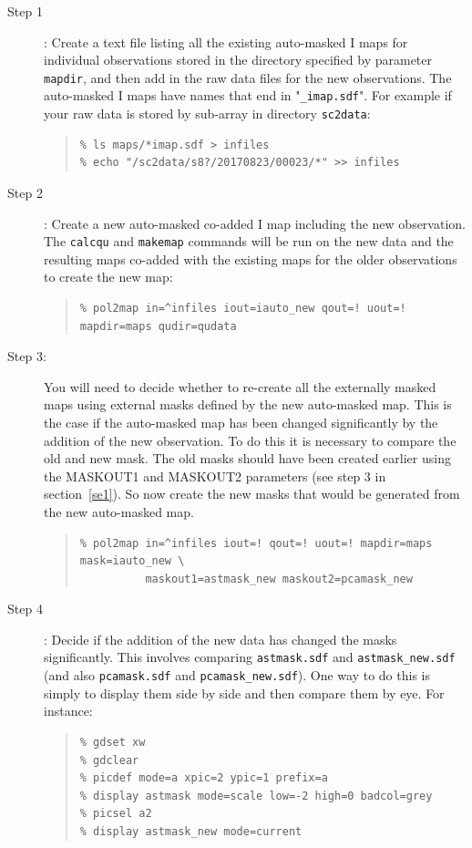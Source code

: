 \documentclass[twoside,11pt]{starlink}
\begin{document}
\begin{description}
\item[Step 1]:  Create a text file listing all the existing auto-masked I maps for
individual observations stored in the directory specified by parameter
\texttt{mapdir}, and then add in the raw data files for the new
observations. The auto-masked I maps have names that end in
"\texttt{\_imap.sdf}". For example if your raw data is stored by sub-array
in directory \texttt{sc2data}:

\begin{quote}
\begin{verbatim}
% ls maps/*imap.sdf > infiles
% echo "/sc2data/s8?/20170823/00023/*" >> infiles
\end{verbatim}
\end{quote}

\item[Step 2]:  Create a new auto-masked co-added I map including the new
observation. The \texttt{calcqu} and \texttt{makemap} commands will
be run on the new data and the resulting maps co-added with the existing
maps for the older observations to create the new map:

\begin{quote}
\begin{verbatim}
% pol2map in=^infiles iout=iauto_new qout=! uout=! mapdir=maps qudir=qudata
\end{verbatim}
\end{quote}

\item[Step 3:] You will need to decide whether to re-create all the externally
masked maps using external masks defined by the new auto-masked map. This is
the case if the auto-masked map has been changed significantly by the addition
of the new observation. To do this it is necessary to compare the old and
new mask. The old masks should have been created earlier using the
MASKOUT1 and MASKOUT2 parameters (see step 3 in section~\ref{se1}). So now
create the new masks that would be generated from the new auto-masked map.
\begin{quote}
\begin{verbatim}
% pol2map in=^infiles iout=! qout=! uout=! mapdir=maps mask=iauto_new \
          maskout1=astmask_new maskout2=pcamask_new
\end{verbatim}
\end{quote}

\item[Step 4]: Decide if the addition of the new data has changed the masks
significantly. This involves comparing \texttt{astmask.sdf} and
\texttt{astmask\_new.sdf} (and also \texttt{pcamask.sdf} and
\texttt{pcamask\_new.sdf}). One way to do this is simply to display them
side by side and then compare them by eye. For instance:
\begin{quote}
\begin{verbatim}
% gdset xw
% gdclear
% picdef mode=a xpic=2 ypic=1 prefix=a
% display astmask mode=scale low=-2 high=0 badcol=grey
% picsel a2
% display astmask_new mode=current
\end{verbatim}
\end{quote}


\end{description}
\end{document}
